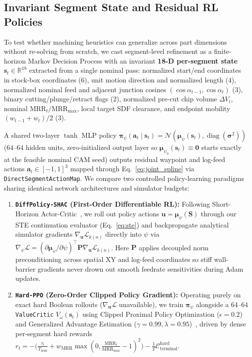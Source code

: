 \documentclass[conference]{IEEEtran}
\begin{document}
\subsection{Invariant Segment State and Residual RL Policies}
To test whether machining heuristics can generalize across part dimensions without re-solving from scratch, we cast segment-level refinement as a finite-horizon Markov Decision Process with an invariant \textbf{18-D per-segment state} $\mathbf{s}_t \in \mathbb{R}^{18}$ extracted from a single nominal pass: normalized start/end coordinates in stock-box coordinates ($6$), unit motion direction and normalized length ($4$), normalized nominal feed and adjacent junction cosines $(\cos\alpha_{t-1}, \cos\alpha_t)$ ($3$), binary cutting/plunge/retract flags ($2$), normalized pre-cut chip volume $\Delta V_t$, nominal $\text{MRR}_t / \text{MRR}_{\max}$, local target SDF clearance, and endpoint mobility $(w_{t-1} + w_t)/2$ ($3$).

A shared two-layer $\tanh$ MLP policy $\boldsymbol{\pi}_\psi(\mathbf{a}_t \mid \mathbf{s}_t) = \mathcal{N}(\boldsymbol{\mu}_\psi(\mathbf{s}_t), \operatorname{diag}(\boldsymbol{\sigma}^2))$ ($64$--$64$ hidden units, zero-initialized output layer so $\boldsymbol{\mu}_{\psi_0}(\mathbf{s}_t) \equiv \mathbf{0}$ starts exactly at the feasible nominal CAM seed) outputs residual waypoint and log-feed actions $\mathbf{a}_t \in [-1, 1]^3$ mapped through Eq.~\eqref{eq:joint_spline} via \texttt{DirectSegmentActionMap}. We compare two controlled policy-learning paradigms sharing identical network architectures and simulator budgets:
\begin{enumerate}
  \item \textbf{\texttt{DiffPolicy-SHAC} (First-Order Differentiable RL):} Following Short-Horizon Actor-Critic~\cite{xu2022accelerated}, we roll out policy actions $\mathbf{u} = \boldsymbol{\mu}_\psi(\mathbf{S})$ through our STE continuation evaluator (Eq.~\eqref{eq:ste}) and backpropagate analytical simulator gradients $\nabla_{\mathbf{u}}\mathcal{L}_{k(n)}$ directly into $\psi$ via $\nabla_\psi \mathcal{L} = (\partial \boldsymbol{\mu}_\psi / \partial \psi)^\top \mathbf{P}\nabla_{\mathbf{u}}\mathcal{L}_{k(n)}$. Here $\mathbf{P}$ applies decoupled norm preconditioning across spatial XY and log-feed coordinates so stiff wall-barrier gradients never drown out smooth feedrate sensitivities during Adam~\cite{kingma2015adam} updates.
  \item \textbf{\texttt{Hard-PPO} (Zero-Order Clipped Policy Gradient):} Operating purely on exact hard Boolean rollouts ($\nabla_{\mathbf{u}}\mathcal{L}$ unavailable), we train $\boldsymbol{\pi}_\psi$ alongside a $64$--$64$ \texttt{ValueCritic} $V_\omega(\mathbf{s}_t)$ using Clipped Proximal Policy Optimization ($\epsilon = 0.2$)~\cite{schulman2017proximal} and Generalized Advantage Estimation ($\gamma = 0.99, \lambda = 0.95$)~\cite{schulman2016gae}, driven by dense per-segment hard rewards $r_t = -\big(\frac{\tau_t}{T_{\text{nom}}} + w_{\text{MRR}}\max(0, \frac{\text{MRR}_t}{\text{MRR}_{\max}} - 1)^2\big) - \frac{1}{T}\mathcal{C}_{\text{terminal}}^{\text{hard}}$.
\end{enumerate}
\end{document}
